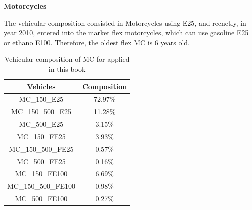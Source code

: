 \documentclass[12pt,graybox,envcountchap,sectrefs]{krantz}
\theoremstyle{definition}
\theoremstyle{definition}
\theoremstyle{definition}
\theoremstyle{remark}
\begin{document}
\textbf{Motorcycles}

The vehicular composition consisted in Motorcycles using E25, and
recnetly, in year 2010, entered into the market flex motorcycles, which
can use gasoline E25 or ethano E100. Therefore, the oldest flex MC is 6
years old.

\begin{table}

\caption{\label{tab:compmc}Vehicular composition of MC for applied in this book}
\centering
\begin{tabular}[t]{cc}
\toprule
Vehicles & Composition\\
\midrule
MC\_150\_E25 & 72.97\%\\
MC\_150\_500\_E25 & 11.28\%\\
MC\_500\_E25 & 3.15\%\\
MC\_150\_FE25 & 3.93\%\\
MC\_150\_500\_FE25 & 0.57\%\\
\addlinespace
MC\_500\_FE25 & 0.16\%\\
MC\_150\_FE100 & 6.69\%\\
MC\_150\_500\_FE100 & 0.98\%\\
MC\_500\_FE100 & 0.27\%\\
\bottomrule
\end{tabular}
\end{table}
\end{document}
